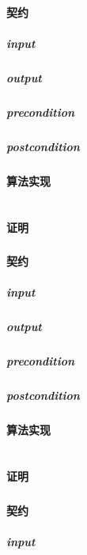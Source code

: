 \documentclass[a4paper]{book}
\numberwithin{equation}{chapter}
\theoremstyle{definition}
\begin{document}
\begin{multicols}{2}
\subsubsection{}
\paragraph{契约}
\subparagraph{input}

\subparagraph{output}

\subparagraph{precondition}

\subparagraph{postcondition}

\paragraph{算法实现}
\begin{lstlisting}

\end{lstlisting}
\paragraph{证明}

\subsubsection{}
\paragraph{契约}
\subparagraph{input}

\subparagraph{output}

\subparagraph{precondition}

\subparagraph{postcondition}

\paragraph{算法实现}
\begin{lstlisting}

\end{lstlisting}
\paragraph{证明}

\subsubsection{}
\paragraph{契约}
\subparagraph{input}


\end{multicols}
\end{document}
